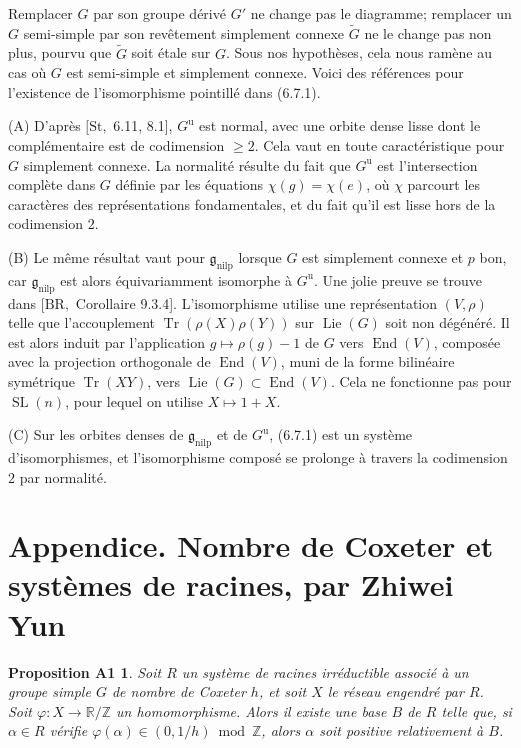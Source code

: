 \documentclass[11pt]{article}
\newcommand{\Lie}{\operatorname{Lie}}
\newcommand{\nilp}{\mathrm{nilp}}
\newcommand{\unip}{\mathrm u}
\newcommand{\SL}{\operatorname{SL}}
\newcommand{\End}{\operatorname{End}}
\newcommand{\Tr}{\operatorname{Tr}}
\newtheorem*{propositionA1}{Proposition A1}
\begin{document}
Remplacer \(G\) par son groupe dérivé \(G'\) ne change pas le diagramme; remplacer un \(G\)
semi-simple par son revêtement simplement connexe \(\widetilde G\) ne le change pas non plus, pourvu
que \(\widetilde G\) soit étale sur \(G\). Sous nos hypothèses, cela nous ramène au cas où \(G\) est
semi-simple et simplement connexe. Voici des références pour l'existence de l'isomorphisme pointillé
dans (6.7.1).

(A) D'après \([\mathrm{St},\) 6.11, 8.1], \(G^{\unip}\) est normal, avec une orbite dense lisse dont le
complémentaire est de codimension \(\ge 2\). Cela vaut en toute caractéristique pour \(G\) simplement
connexe. La normalité résulte du fait que \(G^{\unip}\) est l'intersection complète dans \(G\) définie
par les équations \(\chi(g)=\chi(e)\), où \(\chi\) parcourt les caractères des représentations
fondamentales, et du fait qu'il est lisse hors de la codimension \(2\).

(B) Le même résultat vaut pour \(\mathfrak g_{\nilp}\) lorsque \(G\) est simplement connexe et \(p\)
bon, car \(\mathfrak g_{\nilp}\) est alors équivariamment isomorphe à \(G^{\unip}\). Une jolie preuve
se trouve dans \([\mathrm{BR},\) Corollaire 9.3.4]. L'isomorphisme utilise une représentation
\((V,\rho)\) telle que l'accouplement \(\Tr(\rho(X)\rho(Y))\) sur \(\Lie(G)\) soit non dégénéré. Il
est alors induit par l'application \(g\mapsto \rho(g)-1\) de \(G\) vers \(\End(V)\), composée avec la
projection orthogonale de \(\End(V)\), muni de la forme bilinéaire symétrique \(\Tr(XY)\), vers
\(\Lie(G)\subset\End(V)\). Cela ne fonctionne pas pour \(\SL(n)\), pour lequel on utilise
\(X\mapsto 1+X\).

(C) Sur les orbites denses de \(\mathfrak g_{\nilp}\) et de \(G^{\unip}\), (6.7.1) est un système
d'isomorphismes, et l'isomorphisme composé se prolonge à travers la codimension \(2\) par normalité.

\section*{Appendice. Nombre de Coxeter et systèmes de racines, par Zhiwei Yun}

\begin{propositionA1}
Soit \(R\) un système de racines irréductible associé à un groupe simple \(G\) de nombre de Coxeter
\(h\), et soit \(X\) le réseau engendré par \(R\). Soit
\(\varphi:X\to\mathbb R/\mathbb Z\) un homomorphisme. Alors il existe une base \(B\) de
\(R\) telle que, si \(\alpha\in R\) vérifie
\(\varphi(\alpha)\in(0,1/h)\bmod\mathbb Z\), alors \(\alpha\) soit positive relativement à
\(B\).
\end{propositionA1}
\end{document}
